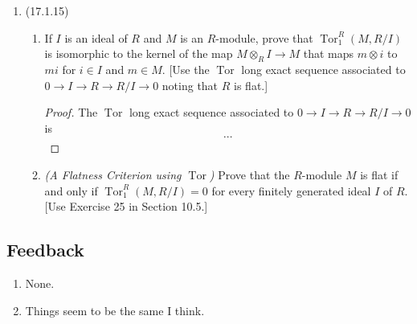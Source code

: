\documentclass[11pt]{article}
\DeclareMathOperator{\Tor}{Tor}
\DeclareMathOperator{\Hom}{Hom}
\DeclareMathOperator{\Ext}{Ext}
\begin{document}
\begin{enumerate}
\begin{proof}
        Then with $D = \Hom_{\mathbb{Z}/m\mathbb{Z}}(A,\mathbb{Z}/m\mathbb{Z})$, we have that $\Ext_{\mathbb{Z}/m\mathbb{Z}}^0(A,\mathbb{Z}/d\mathbb{Z}) \cong \Hom_{\mathbb{Z}/m\mathbb{Z}}(A,\mathbb{Z}/d\mathbb{Z})$. We have also that $\Ext_{\mathbb{Z}/m\mathbb{Z}}^n(A,\mathbb{Z}/d\mathbb{Z})$ is isomorphic to ${}_{m/d}D/dD$ for $n$ odd and to ${}_dD/(m/d)D$ for even $n$. With $m=p^2$, $d=p$, and $A = \mathbb{Z}/p\mathbb{Z}$ we have with $D = \Hom_{\mathbb{Z}/p^2\mathbb{Z}}(\mathbb{Z}/p\mathbb{Z},\mathbb{Z}/p^2\mathbb{Z})\cong \mathbb{Z}/p\mathbb{Z}$. [The elements of $D$ are determined by the value on $[1]$, and $[p]\mapsto [0]$ so that if $f[1] = [a]$ we must have $a = kp$ for some integer $k$, by which we can make the aforementioned identification (there are only $p$ choices of $[a]$).] Then the $p$-torsion of $D$ is $D$ itself and $pD= 0$. Thus by the previous result we have $\Ext_{\mathbb{Z}/p^2\mathbb{Z}}^n(\mathbb{Z}/p\mathbb{Z},\mathbb{Z}/p\mathbb{Z})\cong \mathbb{Z}/p\mathbb{Z}$ for $n\geq 1$. We have also that $\Ext_{\mathbb{Z}/p^2\mathbb{Z}}^0(\mathbb{Z}/p\mathbb{Z},\mathbb{Z}/p\mathbb{Z})\cong \Hom_{\mathbb{Z}/p^2\mathbb{Z}}(\mathbb{Z}/p\mathbb{Z},\mathbb{Z}/p\mathbb{Z})\cong\mathbb{Z}/p\mathbb{Z}$ as needed.
    \end{proof}
    \item (17.1.15)\begin{enumerate}
        \item If $I$ is an ideal of $R$ and $M$ is an $R$-module, prove that $\Tor_1^R(M,R/I)$ is isomorphic to the kernel of the map $M\otimes_R I\to M$ that maps $m\otimes i$ to $mi$ for $i\in I$ and $m\in M$. [Use the $\Tor$ long exact sequence associated to $0\to I\to R \to R/I\to 0$ noting that $R$ is flat.] \begin{proof}
            The $\Tor$ long exact sequence associated to $0\to I\to R \to R/I\to 0$ is \[\cdots\]
        \end{proof}
        \item \textit{(A Flatness Criterion using $\Tor$)} Prove that the $R$-module $M$ is flat if and only if $\Tor_1^R(M,R/I) = 0$ for every finitely generated ideal $I$ of $R$. [Use Exercise 25 in Section 10.5.]
    \end{enumerate}
\end{enumerate}
\subsection*{Feedback}
\begin{enumerate}
    \item None.
    \item Things seem to be the same I think.
\end{enumerate}
\end{document}
